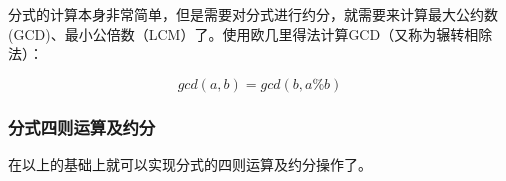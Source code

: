 \documentclass[12pt]{article}
\begin{document}
分式的计算本身非常简单，但是需要对分式进行约分，就需要来计算最大公约数(GCD)、最小公倍数（LCM）了。使用欧几里得法计算GCD（又称为辗转相除法）：

\[
gcd(a,b) = gcd(b, a\%b)
\]

\begin{Shaded}
\begin{Highlighting}[]
   \OperatorTok{(}\OperatorTok{,} \OperatorTok{)} \OperatorTok{\{}
    \OperatorTok{\%}\OperatorTok{==}  \OperatorTok{:} \OperatorTok{(}\OperatorTok{,}\OperatorTok{\%}\OperatorTok{);}
\OperatorTok{\}}

   \OperatorTok{(}\OperatorTok{,} \OperatorTok{)} \OperatorTok{\{}
    \OperatorTok{*}\OperatorTok{/} \OperatorTok{(}\OperatorTok{,}\OperatorTok{);}
\OperatorTok{\}}
\end{Highlighting}
\end{Shaded}

\subsubsection{分式四则运算及约分}\label{ux5206ux5f0fux56dbux5219ux8fd0ux7b97ux53caux7ea6ux5206}

在以上的基础上就可以实现分式的四则运算及约分操作了。
\end{document}
